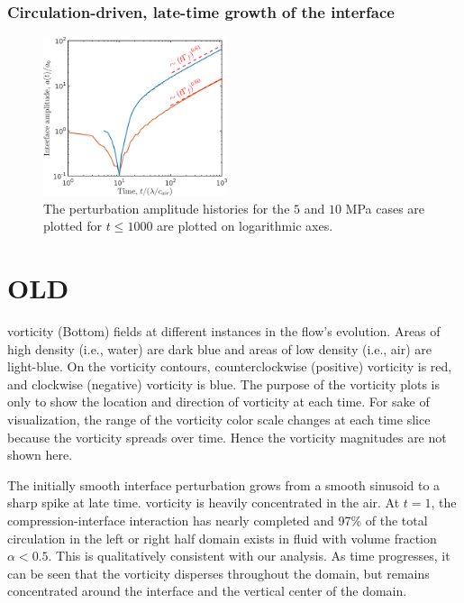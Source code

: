 \subsubsection{Circulation-driven, late-time growth of the interface}
\begin{figure}[h] 
  \centering
  \includegraphics[width=0.48\textwidth]{./figs/lung_figs/interface_multi-amp_loglog_roe_t1000}
  \caption[The long term interface perturbation amplitude
  histories]{The perturbation amplitude histories for the $5$ and $10$
    MPa cases are plotted for $t\leq1000$ are plotted on logarithmic
    axes.}
  \label{fig:trapz10_circ_interface}
\end{figure}






\section{OLD}

 vorticity (Bottom) fields at different instances in
the flow's evolution. Areas of high density (i.e., water) are dark
blue and areas of low density (i.e., air) are light-blue. On the
vorticity contours, counterclockwise (positive) vorticity is red, and
clockwise (negative) vorticity is blue. The purpose of the vorticity
plots is only to show the location and direction of vorticity at each
time. For sake of visualization, the range of the vorticity color
scale changes at each time slice because the vorticity spreads over
time. Hence the vorticity magnitudes are not shown here.  

The initially smooth interface perturbation grows from a smooth
sinusoid to a sharp spike at late time.  vorticity is heavily
concentrated in the air. At $t=1$, the compression-interface
interaction has nearly completed and 97\% of the total circulation in
the left or right half domain exists in fluid with volume fraction
$\alpha<0.5$. This is qualitatively consistent with our analysis. As
time progresses, it can be seen that the vorticity disperses
throughout the domain, but remains concentrated around the interface
and the vertical center of the domain.

